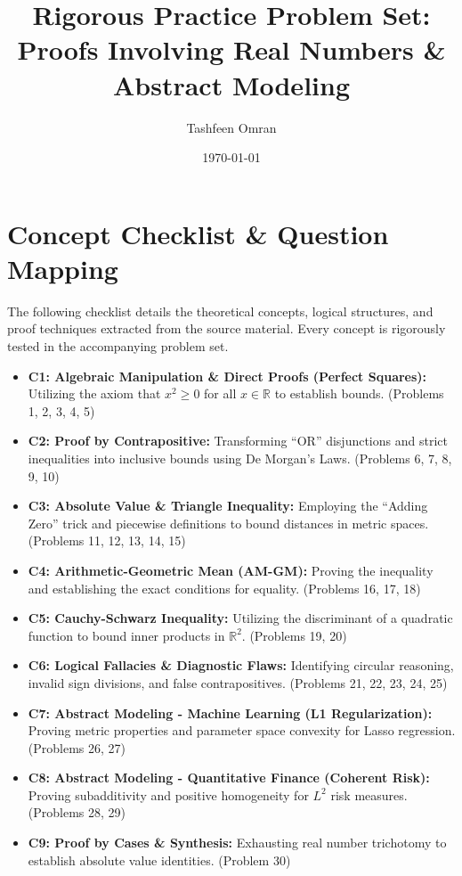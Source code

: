 \documentclass[11pt]{article}
\title{\textbf{Rigorous Practice Problem Set: \\ Proofs Involving Real Numbers \& Abstract Modeling}}
\author{Tashfeen Omran}
\date{\today}
\begin{document}
\maketitle

\tableofcontents
\newpage

\section{Concept Checklist \& Question Mapping}
\label{sec:checklist_start}
The following checklist details the theoretical concepts, logical structures, and proof techniques extracted from the source material. Every concept is rigorously tested in the accompanying problem set.

\begin{itemize}
    \item \textbf{C1: Algebraic Manipulation \& Direct Proofs (Perfect Squares):} Utilizing the axiom that $x^2 \ge 0$ for all $x \in \mathbb{R}$ to establish bounds. (Problems 1, 2, 3, 4, 5)
    \item \textbf{C2: Proof by Contrapositive:} Transforming ``OR'' disjunctions and strict inequalities into inclusive bounds using De Morgan's Laws. (Problems 6, 7, 8, 9, 10)
    \item \textbf{C3: Absolute Value \& Triangle Inequality:} Employing the ``Adding Zero'' trick and piecewise definitions to bound distances in metric spaces. (Problems 11, 12, 13, 14, 15)
    \item \textbf{C4: Arithmetic-Geometric Mean (AM-GM):} Proving the inequality and establishing the exact conditions for equality. (Problems 16, 17, 18)
    \item \textbf{C5: Cauchy-Schwarz Inequality:} Utilizing the discriminant of a quadratic function to bound inner products in $\mathbb{R}^2$. (Problems 19, 20)
    \item \textbf{C6: Logical Fallacies \& Diagnostic Flaws:} Identifying circular reasoning, invalid sign divisions, and false contrapositives. (Problems 21, 22, 23, 24, 25)
    \item \textbf{C7: Abstract Modeling - Machine Learning (L1 Regularization):} Proving metric properties and parameter space convexity for Lasso regression. (Problems 26, 27)
    \item \textbf{C8: Abstract Modeling - Quantitative Finance (Coherent Risk):} Proving subadditivity and positive homogeneity for $L^2$ risk measures. (Problems 28, 29)
    \item \textbf{C9: Proof by Cases \& Synthesis:} Exhausting real number trichotomy to establish absolute value identities. (Problem 30)
\end{itemize}
\end{document}
